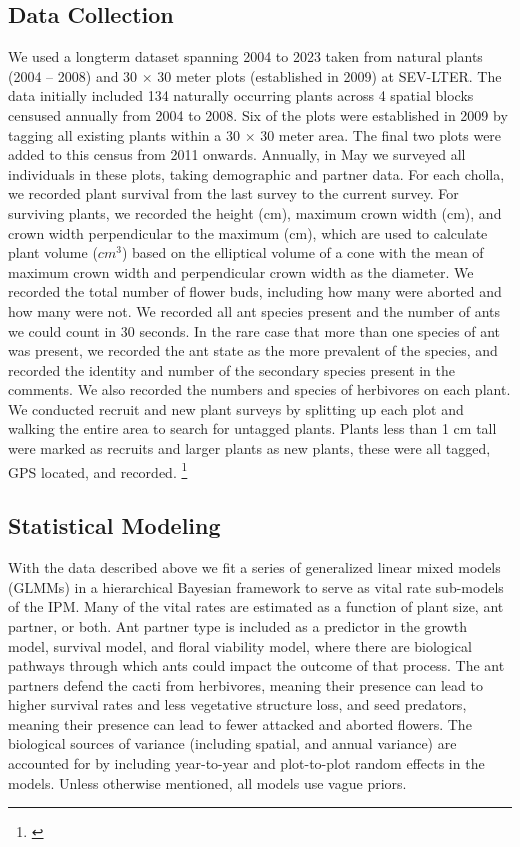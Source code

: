 \documentclass[11pt]{article}
\newcommand{\tom}[2]{{\color{red}{#1}}\footnote{\textit{\color{red}{#2}}}}
\begin{document}
\subsection*{Data Collection}

We used a longterm dataset spanning 2004 to 2023 taken from natural plants (2004 -- 2008) and 30 $\times$ 30 meter plots (established in 2009) at SEV-LTER. 
The data initially included 134 naturally occurring plants across 4 spatial blocks censused annually from 2004 to 2008.
Six of the plots were established in 2009 by tagging all existing plants within a 30 $\times$ 30 meter area. 
The final two plots were added to this census from 2011 onwards. 
Annually, in May we surveyed all individuals in these plots, taking demographic and partner data. 
For each cholla, we recorded plant survival from the last survey to the current survey. 
For surviving plants, we recorded the height (cm), maximum crown width (cm), and crown width perpendicular to the maximum (cm), which are used to calculate plant volume ($cm^3$) based on the  elliptical volume of a cone with the mean of maximum crown width and perpendicular crown width as the diameter. 
We recorded the total number of flower buds, including how many were aborted and how many were not. 
We recorded all ant species present and the number of ants we could count in 30 seconds.
In the rare case that more than one species of ant was present, we recorded the ant state as the more prevalent of the species, and recorded the identity and number of the secondary species present in the comments. 
We also recorded the numbers and species of herbivores on each plant.
We conducted recruit and new plant surveys by splitting up each plot and walking the entire area to search for untagged plants. 
Plants less than 1 cm tall were marked as recruits and larger plants as new plants, these were all tagged, GPS located, and recorded. 
\tom{}{Also need to describe recruit data, seed banks, seed counts per fruit.}
		
\subsection*{Statistical Modeling}
	
With the data described above we fit a series of generalized linear mixed models (GLMMs) in a hierarchical Bayesian framework to serve as vital rate sub-models of the IPM.
Many of the vital rates are estimated as a function of plant size, ant partner, or both.
Ant partner type is included as a predictor in the growth model, survival model, and floral viability model, where there are biological pathways through which ants could impact the outcome of that process.
The ant partners defend the cacti from herbivores, meaning their presence can lead to higher survival rates and less vegetative structure loss, and seed predators, meaning their presence can lead to fewer attacked and aborted flowers.
The biological sources of variance (including spatial, and annual variance) are accounted for by including year-to-year and plot-to-plot random effects in the models. 
Unless otherwise mentioned, all models use vague priors. 
\end{document}
